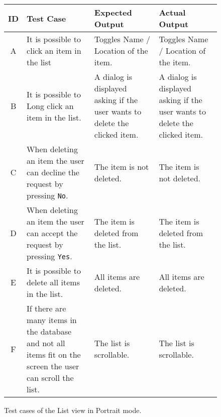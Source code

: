 \begin{figure}[H]
	\renewcommand*{\arraystretch}{1.5} %
	\begin{tabular}{| c | p{3.5cm} | p{3.5cm} | p{3.5cm} |}
		\hline
		{\textbf{ID} } & {\textbf{Test Case} } & {\textbf{Expected Output}} & {\textbf {Actual Output}} \\\hline\hline
		A &	It is possible to click an item in the list & Toggles Name / Location of the item.  & Toggles Name / Location of the item. \\ \hline
		B & It is possible to Long click an item in the list. & A dialog is displayed asking if the user wants to delete the clicked item. & A dialog is displayed asking if the user wants to delete the clicked item. \\ \hline
		C & When deleting an item the user can decline the request by pressing \texttt{No}. & The item is not deleted. & The item is not deleted. \\ \hline
		D & When deleting an item the user can accept the request by pressing \texttt{Yes}. & The item is deleted from the list. & The item is deleted from the list. \\ \hline
		E & It is possible to delete all items in the list. & All items are deleted. & All items are deleted. \\ \hline
		F & If there are many items in the database and not all items fit on the screen the user
		can scroll the list. & The list is scrollable. & The list is scrollable. \\ \hline
	\end{tabular}
	
	\caption{Test cases of the List view in Portrait mode.}
	\label{tab:test-cases-list-portrait}
\end{figure}

